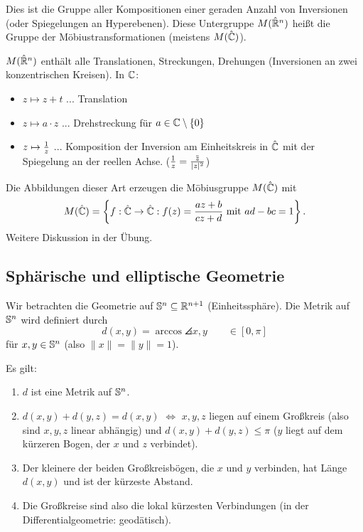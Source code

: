 Dies ist die Gruppe aller Kompositionen einer geraden Anzahl von Inversionen
(oder Spiegelungen an Hyperebenen). Diese Untergruppe $M(\hat{\mathbb{R}}^n)$ heißt
die Gruppe der Möbius\-trans\-formationen (meistens $M(\hat{\mathbb{C}})$).

$M(\hat{\mathbb{R}}^n)$ enthält alle Translationen, Streckungen, Drehungen
(Inversionen an zwei konzentrischen Kreisen). In $\mathbb{C}$:
\begin{itemize}
  \item $z \mapsto z + t$ ... Translation
  \item $z \mapsto a \cdot z$ ... Drehstreckung für $a \in \mathbb{C} \setminus \{
    0 \}$
  \item $z \mapsto \frac{1}{z}$ ... Komposition der Inversion am Einheitskreis in
    $\hat{\mathbb{C}}$ mit der Spiegelung an der reellen Achse. ($\rez{z} = \frac{\obar{z}}{|z|^2}$)
\end{itemize}

Die Abbildungen dieser Art erzeugen die Möbiusgruppe $M(\hat{\mathbb{C}})$ mit
\[ M(\hat{\mathbb{C}}) = \left\{ f: \hat{\mathbb{C}} \to \hat{\mathbb{C}} : f(z) = \frac{ az +
    b}{c z + d} \text{ mit } ad - bc = 1 \right\}. \]
Weitere Diskussion in der Übung.

\subsection{Sphärische und elliptische Geometrie}
Wir betrachten die Geometrie auf $\mathbb{S}^n \subseteq \mathbb{R}^{n+1}$
(Einheitssphäre). Die Metrik auf $\mathbb{S}^n$ wird definiert durch
\[ d(x,y) = \arccos \angles{x,y} \qquad \in [0,\pi] \]
für $x,y \in \mathbb{S}^n$ (also $\| x \| = \| y \| = 1$).

Es gilt:
\begin{enumerate}
  \item $d$ ist eine Metrik auf $\mathbb{S}^n$.
  \item $d(x,y) + d(y,z) = d(x,y)$ $\Leftrightarrow$ $x,y,z$ liegen auf einem
    Großkreis (also sind $x,y,z$ linear abhängig) und $d(x,y) + d(y,z) \le
    \pi$ ($y$ liegt auf dem kürzeren Bogen, der $x$ und $z$ verbindet).
  \item Der kleinere der beiden Großkreisbögen, die $x$ und $y$ verbinden, hat
    Länge $d(x,y)$ und ist der kürzeste Abstand.
  \item Die Großkreise sind also die lokal kürzesten Verbindungen (in der
    Differentialgeometrie: geodätisch).
\end{enumerate}

